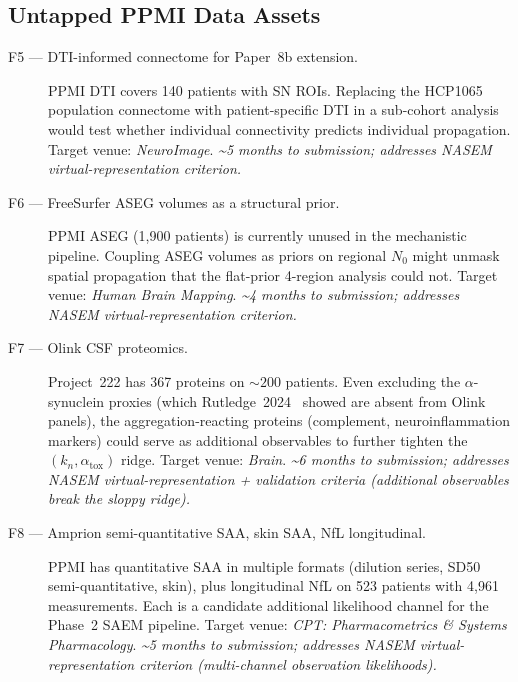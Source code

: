 \subsection{Untapped PPMI Data Assets}
\label{sec:conc-untapped}

\begin{description}
  \item[F5 --- DTI-informed connectome for Paper~8b extension.] PPMI DTI covers 140 patients with SN ROIs. Replacing the HCP1065 population connectome with patient-specific DTI in a sub-cohort analysis would test whether individual connectivity predicts individual propagation. Target venue: \emph{NeuroImage}. \emph{\textasciitilde5 months to submission; addresses NASEM virtual-representation criterion.}

  \item[F6 --- FreeSurfer ASEG volumes as a structural prior.] PPMI ASEG (1,900 patients) is currently unused in the mechanistic pipeline. Coupling ASEG volumes as priors on regional $N_0$ might unmask spatial propagation that the flat-prior 4-region analysis could not. Target venue: \emph{Human Brain Mapping}. \emph{\textasciitilde4 months to submission; addresses NASEM virtual-representation criterion.}

  \item[F7 --- Olink CSF proteomics.] Project~222 has 367 proteins on $\sim 200$ patients. Even excluding the $\alpha$-synuclein proxies (which Rutledge~2024~\cite{rutledge2024} showed are absent from Olink panels), the aggregation-reacting proteins (complement, neuroinflammation markers) could serve as additional observables to further tighten the $(k_n, \alpha_\text{tox})$ ridge. Target venue: \emph{Brain}. \emph{\textasciitilde6 months to submission; addresses NASEM virtual-representation + validation criteria (additional observables break the sloppy ridge).}

  \item[F8 --- Amprion semi-quantitative SAA, skin SAA, NfL longitudinal.] PPMI has quantitative SAA in multiple formats (dilution series, SD50 semi-quantitative, skin), plus longitudinal NfL on 523 patients with 4,961 measurements. Each is a candidate additional likelihood channel for the Phase~2 SAEM pipeline. Target venue: \emph{CPT: Pharmacometrics \& Systems Pharmacology}. \emph{\textasciitilde5 months to submission; addresses NASEM virtual-representation criterion (multi-channel observation likelihoods).}
\end{description}

